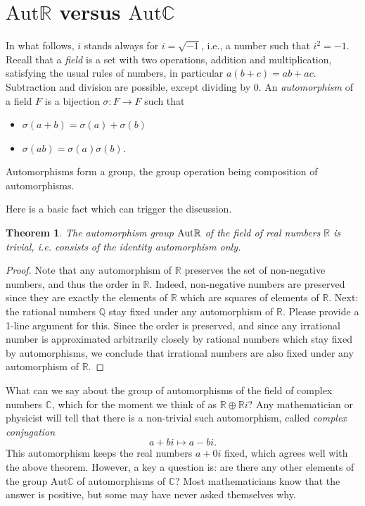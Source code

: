 \documentclass[11pt]{article}
\theoremstyle{plain}
\newtheorem{theorem}{Theorem}[section]
\theoremstyle{definition}
\theoremstyle{remark}
\begin{document}
\section{$\mathrm{Aut} \mathbb{R}$ versus $\mathrm{Aut}\mathbb{C}$}
In what follows, $i$ stands always for $ i = \sqrt{-1}$, i.e., a number such that $i^2 = -1$. Recall that a \textit{field} is a set with two operations, addition and multiplication, satisfying the usual rules of numbers, in particular $a(b+c) = ab + ac$. Subtraction and division are possible, except dividing by $0$.
An \textit{automorphism} of a field $F$ is a bijection $\sigma:F \to F$ such that
\begin{itemize}
    \item $\sigma(a+b) = \sigma(a) + \sigma(b)$
    \item $\sigma(ab) = \sigma(a)\sigma(b)$.
\end{itemize}
Automorphisms form a group, the group operation being composition of automorphisms.

Here is a basic fact which can trigger the discussion.

\begin{theorem}
    The automorphism group $\textnormal{Aut} \mathbb{R}$ of the field of real numbers $\mathbb{R}$ is trivial, i.e. consists of the identity automorphism only.
\end{theorem}

\begin{proof}
    Note that any automorphism of $\mathbb{R}$ preserves the set of non-negative numbers, and thus the order in $\mathbb{R}$. Indeed, non-negative numbers are preserved since they are exactly the elements of $\mathbb{R}$ which are squares of elements of $\mathbb{R}$.  Next: the rational numbers $\mathbb{Q}$ stay fixed under any automorphism of $\mathbb{R}$. Please provide a 1-line argument for this. Since the order is preserved, and since any irrational number is approximated arbitrarily closely by rational numbers which stay fixed by automorphisms, we conclude that irrational numbers are also fixed under any automorphism of $\mathbb{R}$.
\end{proof}

What can we say about the group of automorphisms of the field of complex numbers $\mathbb{C}$, which for the moment we think of as $\mathbb{R}\oplus\mathbb{R}i$? Any mathematician or physicist will tell that there is a non-trivial such automorphism, called \textit{complex conjugation}
$$ a + bi \mapsto a - bi.$$
This automorphism keeps the real numbers $a + 0i$ fixed, which agrees well with the above theorem. However, a key a question is: are there any other elements of the group $\mathrm{Aut} \mathbb{C}$ of automorphisms of $\mathbb{C}$? Most mathematicians know that the answer is positive, but some may have never asked themselves why. 
\end{document}
